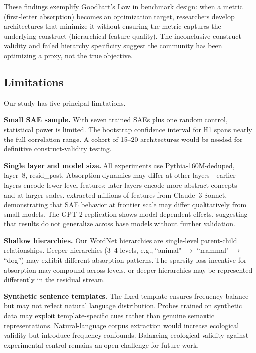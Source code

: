 \documentclass{article}
\begin{document}
These findings exemplify Goodhart's Law in benchmark design: when a metric (first-letter absorption) becomes an optimization target, researchers develop architectures that minimize it without ensuring the metric captures the underlying construct (hierarchical feature quality). The inconclusive construct validity and failed hierarchy specificity suggest the community has been optimizing a proxy, not the true objective.

\subsection{Limitations}\label{sec:limitations}

Our study has five principal limitations.

\textbf{Small SAE sample.} With seven trained SAEs plus one random control, statistical power is limited. The bootstrap confidence interval for H1 spans nearly the full correlation range. A cohort of 15--20 architectures would be needed for definitive construct-validity testing.

\textbf{Single layer and model size.} All experiments use Pythia-160M-deduped, layer~8, resid\_post. Absorption dynamics may differ at other layers---earlier layers encode lower-level features; later layers encode more abstract concepts---and at larger scales. \citet{templeton2024scaling} extracted millions of features from Claude~3 Sonnet, demonstrating that SAE behavior at frontier scale may differ qualitatively from small models. The GPT-2 replication shows model-dependent effects, suggesting that results do not generalize across base models without further validation.

\textbf{Shallow hierarchies.} Our WordNet hierarchies are single-level parent-child relationships. Deeper hierarchies (3--4 levels, e.g., ``animal" $\to$ ``mammal" $\to$ ``dog'') may exhibit different absorption patterns. The sparsity-loss incentive for absorption may compound across levels, or deeper hierarchies may be represented differently in the residual stream.

\textbf{Synthetic sentence templates.} The fixed template ensures frequency balance but may not reflect natural language distribution. Probes trained on synthetic data may exploit template-specific cues rather than genuine semantic representations. Natural-language corpus extraction would increase ecological validity but introduce frequency confounds. Balancing ecological validity against experimental control remains an open challenge for future work.
\end{document}
